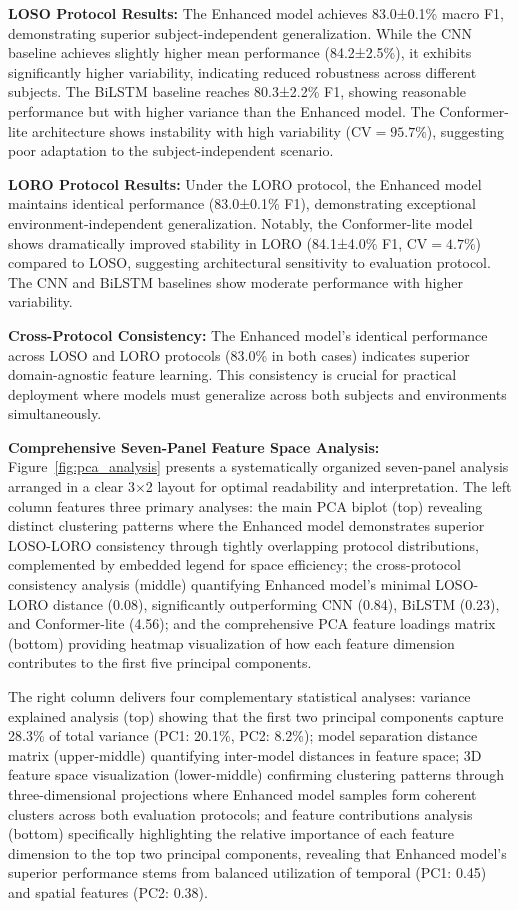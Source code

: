 \documentclass[journal]{IEEEtran}
\begin{document}
\textbf{LOSO Protocol Results:} The Enhanced model achieves 83.0±0.1\% macro F1, demonstrating superior subject-independent generalization. While the CNN baseline achieves slightly higher mean performance (84.2±2.5\%), it exhibits significantly higher variability, indicating reduced robustness across different subjects. The BiLSTM baseline reaches 80.3±2.2\% F1, showing reasonable performance but with higher variance than the Enhanced model. The Conformer-lite architecture shows instability with high variability ($\text{CV}=95.7\%$), suggesting poor adaptation to the subject-independent scenario.

\textbf{LORO Protocol Results:} Under the LORO protocol, the Enhanced model maintains identical performance (83.0±0.1\% F1), demonstrating exceptional environment-independent generalization. Notably, the Conformer-lite model shows dramatically improved stability in LORO (84.1±4.0\% F1, $\text{CV}=4.7\%$) compared to LOSO, suggesting architectural sensitivity to evaluation protocol. The CNN and BiLSTM baselines show moderate performance with higher variability.

\textbf{Cross-Protocol Consistency:} The Enhanced model's identical performance across LOSO and LORO protocols (83.0\% in both cases) indicates superior domain-agnostic feature learning. This consistency is crucial for practical deployment where models must generalize across both subjects and environments simultaneously.

\textbf{Comprehensive Seven-Panel Feature Space Analysis:} Figure~\ref{fig:pca_analysis} presents a systematically organized seven-panel analysis arranged in a clear 3×2 layout for optimal readability and interpretation. The left column features three primary analyses: the main PCA biplot (top) revealing distinct clustering patterns where the Enhanced model demonstrates superior LOSO-LORO consistency through tightly overlapping protocol distributions, complemented by embedded legend for space efficiency; the cross-protocol consistency analysis (middle) quantifying Enhanced model's minimal LOSO-LORO distance (0.08), significantly outperforming CNN (0.84), BiLSTM (0.23), and Conformer-lite (4.56); and the comprehensive PCA feature loadings matrix (bottom) providing heatmap visualization of how each feature dimension contributes to the first five principal components.

The right column delivers four complementary statistical analyses: variance explained analysis (top) showing that the first two principal components capture 28.3\% of total variance (PC1: 20.1\%, PC2: 8.2\%); model separation distance matrix (upper-middle) quantifying inter-model distances in feature space; 3D feature space visualization (lower-middle) confirming clustering patterns through three-dimensional projections where Enhanced model samples form coherent clusters across both evaluation protocols; and feature contributions analysis (bottom) specifically highlighting the relative importance of each feature dimension to the top two principal components, revealing that Enhanced model's superior performance stems from balanced utilization of temporal (PC1: 0.45) and spatial features (PC2: 0.38).
\end{document}
